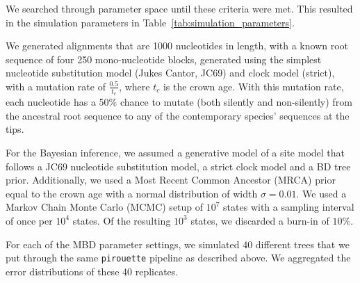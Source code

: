 We searched through parameter space until these criteria were met.
This resulted in the simulation parameters in Table~\ref{tab:simulation_parameters}.



We generated alignments that are 1000 nucleotides in length, with a known root sequence of four 250 mono-nucleotide blocks, generated using the simplest nucleotide substitution model (Jukes Cantor, JC69) and clock model (strict), with a mutation rate of $\frac{0.5}{t_c}$, where $t_c$ is the crown age. 
With this mutation rate, each nucleotide has a 50\% chance to mutate (both silently and non-silently) from the ancestral root sequence to any of the contemporary species' sequences at the tips. 

For the Bayesian inference, we assumed a generative model of a site model that
follows a JC69 nucleotide substitution model, a strict clock model and a BD tree prior.
Additionally, we used a Most Recent Common Ancestor (MRCA) prior equal to the crown age with a normal distribution of width $\sigma = 0.01$. We used a Markov Chain Monte Carlo (MCMC) setup of $10^7$ states with a sampling interval of once per $10^4$ states. Of the resulting $10^3$ states, we discarded a burn-in of $10\%$.

For each of the MBD parameter settings, we simulated 40 different trees
that we put through the same \verb;pirouette; pipeline as described above. We aggregated the error distributions of these 40 replicates.



